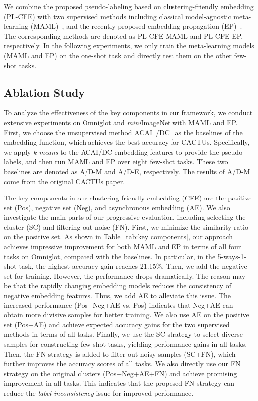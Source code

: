 \documentclass[runningheads]{llncs}
\def\ourmodel{PL-CFE}
\begin{document}
 We combine the proposed pseudo-labeling based on clustering-friendly embedding (\ourmodel) with two supervised methods including classical model-agnostic meta-learning (MAML)~\cite{finn2017model}, and the recently proposed embedding propagation (EP)~\cite{rodriguez2020embedding}. The corresponding methods are denoted as \ourmodel-MAML and \ourmodel-EP, respectively. 
In the following experiments, we only train the meta-learning models (MAML and EP) on the one-shot task and directly test them on the other few-shot tasks. 







\subsection{Ablation Study}


To analyze the effectiveness of the key components in our framework, we conduct extensive experiments on Omniglot and \textit{mini}ImageNet with MAML and EP. First, we choose the unsupervised method ACAI~\cite{berthelot2018understanding}/DC~\cite{caron2018deep} as the baselines of the embedding function, which achieves the best accuracy for CACTUs. Specifically, we apply \textit{k-means} to the ACAI/DC embedding features to provide the pseudo-labels, and then run MAML and EP over eight few-shot tasks. These two baselines are denoted as A/D-M and A/D-E, respectively. The results of A/D-M come from the original CACTUs paper. 






The key components in our clustering-friendly embedding (CFE) are the positive set (Pos), negative set (Neg), and asynchronous embedding (AE). We also investigate the main parts of our progressive evaluation, including selecting the cluster (SC) and filtering out noise (FN). First, we minimize the similarity ratio on the positive set. As shown in Table~\ref{tab:key components}, our approach achieves impressive improvement for both MAML and EP in terms of all four tasks on Omniglot, compared with the baselines. In particular, in the 5-ways-1-shot task, the highest accuracy gain reaches 21.15\%. Then, we add the negative set for training. However, the performance drops dramatically. The reason may be that the rapidly changing embedding models reduces the consistency of negative embedding features. Thus, we add AE to alleviate this issue. The increased performance (Pos+Neg+AE vs. Pos) indicates that Neg+AE can obtain more divisive samples for better training. We also use AE on the positive set (Pos+AE) and achieve expected accuracy gains for the two supervised methods in terms of all tasks. 
Finally, we use the SC strategy to select diverse samples for constructing few-shot tasks, yielding performance gains in all tasks. Then, the FN strategy is added to filter out noisy samples (SC+FN), which further improves the accuracy scores of all tasks. We also directly use our FN strategy on the original clusters (Pos+Neg+AE+FN) and achieve promising improvement in all tasks. This indicates that the proposed FN strategy can reduce the \textit{label inconsistency} issue for improved performance. 
\end{document}
